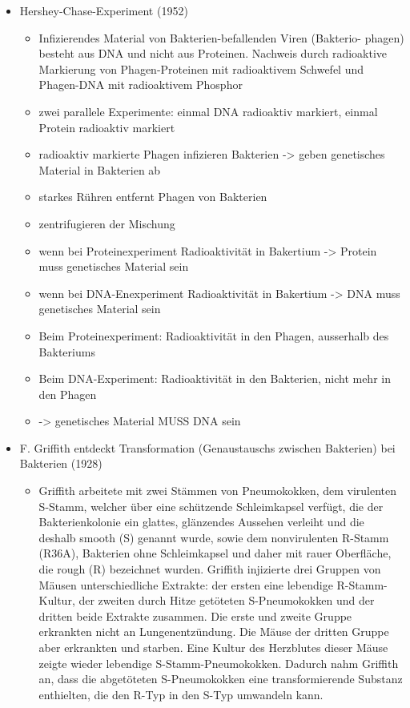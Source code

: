 \documentclass{article}
\begin{document}
\begin{itemize}
    \item Hershey-Chase-Experiment (1952)
        \begin{itemize}
            \item Infizierendes Material von Bakterien-befallenden Viren (Bakterio- phagen) besteht aus DNA und nicht aus Proteinen. Nachweis durch radioaktive Markierung von Phagen-Proteinen mit radioaktivem Schwefel und Phagen-DNA mit radioaktivem Phosphor
            \item zwei parallele Experimente: einmal DNA radioaktiv markiert, einmal Protein radioaktiv markiert
            \item radioaktiv markierte Phagen infizieren Bakterien -> geben genetisches Material in Bakterien ab
            \item starkes Rühren entfernt Phagen von Bakterien
            \item zentrifugieren der Mischung
            \item wenn bei Proteinexperiment Radioaktivität in Bakertium -> Protein muss genetisches Material sein
            \item wenn bei DNA-Enexperiment Radioaktivität in Bakertium -> DNA muss genetisches Material sein
            \item Beim Proteinexperiment: Radioaktivität in den Phagen, ausserhalb des Bakteriums
            \item Beim DNA-Experiment: Radioaktivität in den Bakterien, nicht mehr in den Phagen
            \item -> genetisches Material MUSS DNA sein
        \end{itemize}        
        
    \item F. Griffith entdeckt Transformation (Genaustauschs zwischen Bakterien) bei Bakterien (1928)
        \begin{itemize}
            \item Griffith arbeitete mit zwei Stämmen von Pneumokokken, dem virulenten S-Stamm, welcher über eine schützende Schleimkapsel verfügt, die der Bakterienkolonie ein glattes, glänzendes Aussehen verleiht und die deshalb smooth (S) genannt wurde, sowie dem nonvirulenten R-Stamm (R36A), Bakterien ohne Schleimkapsel und daher mit rauer Oberfläche, die rough (R) bezeichnet wurden. Griffith injizierte drei Gruppen von Mäusen unterschiedliche Extrakte: der ersten eine lebendige R-Stamm-Kultur, der zweiten durch Hitze getöteten S-Pneumokokken und der dritten beide Extrakte zusammen. Die erste und zweite Gruppe erkrankten nicht an Lungenentzündung. Die Mäuse der dritten Gruppe aber erkrankten und starben. Eine Kultur des Herzblutes dieser Mäuse zeigte wieder lebendige S-Stamm-Pneumokokken. Dadurch nahm Griffith an, dass die abgetöteten S-Pneumokokken eine transformierende Substanz enthielten, die den R-Typ in den S-Typ umwandeln kann.
        \end{itemize}        
        

\end{itemize}
\end{document}
